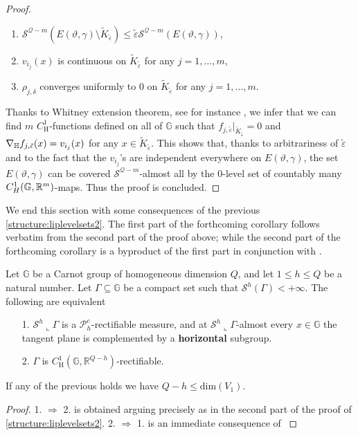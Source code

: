 \documentclass[10pt, a4paper,
oneside, headinclude,footinclude]{scrartcl}
\begin{document}
\begin{proof}
\begin{enumerate}
    \item $\mathcal{S}^{\mathcal{Q}-m}( E(\vartheta,\gamma)\setminus \tilde K_{\tilde \varepsilon})\leq \tilde \varepsilon\mathcal{S}^{\mathcal{Q}-m}( E(\vartheta,\gamma))$,
    \item $v_{i_j}(x)$ is continuous on $\tilde K_{\tilde \varepsilon}$ for any $j=1,\ldots,m$,
    \item $\rho_{j,\delta}$ converges uniformly to $0$ on $\tilde K_{\tilde \varepsilon}$ for any $j=1,\ldots,m$.
\end{enumerate}
Thanks to Whitney extension theorem, see for instance \cite[Theorem 5.2]{step2}, we infer that we can find $m$ $C^1_{\mathrm{H}}$-functions defined on all of $\mathbb G$ such that $f_{j,\tilde \varepsilon}\vert_{\tilde K_{\tilde \varepsilon}}=0$ and $\nabla_{\mathbb{H}} f_{j,\tilde \varepsilon}(x)=v_{i_j}(x)$ for any $x\in \widetilde K_{\tilde \varepsilon}$. This shows that, thanks to arbitrariness of $\tilde \varepsilon$ and to the fact that the $v_{i_j}$'s are independent everywhere on $E(\vartheta,\gamma)$, the set $E(\vartheta,\gamma)$ can be covered $\mathcal{S}^{\mathcal{Q}-m}$-almost all by the $0$-level set of countably many $C^1_H(\mathbb{G},\mathbb{R}^m)$-maps. Thus the proof is concluded.
\end{proof}

We end this section with some consequences of the previous \cref{structure:liplevelsets2}. The first part of the forthcoming corollary follows verbatim from the second part of the proof above; while the second part of the forthcoming corollary is a byproduct of the first part in conjunction with \cite[Proposition 6.2]{antonelli2020rectifiable}.

\begin{corollario}\label{cor:PhCCoorizzontali}
Let $\mathbb G$ be a Carnot group of homogeneous dimension $Q$, and let $1\leq h\leq Q$ be a natural number. Let $\Gamma\subseteq \mathbb G$ be a compact set such that $\mathcal{S}^h(\Gamma)<+\infty$. The following are equivalent 
\begin{enumerate}
    \item[1.] $\mathcal{S}^h\llcorner\Gamma$ is a $\mathscr{P}_h^c$-rectifiable measure, and at $\mathcal{S}^h\llcorner\Gamma$-almost every $x\in\mathbb G$ the tangent plane is complemented by a \textbf{horizontal} subgroup.
    \item[2.] $\Gamma$ is $C^1_{\mathrm{H}}(\mathbb G,\mathbb R^{Q-h})$-rectifiable.
\end{enumerate}
\end{corollario}
If any of the previous holds we have $Q-h\leq \mathrm{dim}(V_1)$.
\begin{proof}
1. $\Rightarrow$ 2. is obtained arguing precisely as in the second part of the proof of \cref{structure:liplevelsets2}. 2. $\Rightarrow$ 1. is an immediate consequence of \cite[Proposition 6.2]{antonelli2020rectifiable}
\end{proof}
\end{document}
